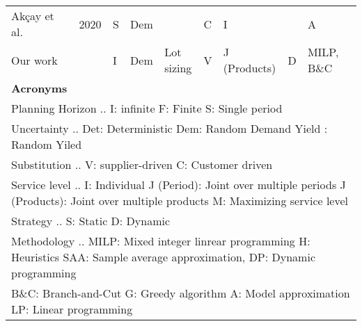 \documentclass[11pt]{article}
\begin{document}
\begin{table}[]
\begin{adjustbox}{width=1\textwidth,center=\textwidth}
\begin{tabular}{llllllllll}
Akçay et al.~\cite{akccaycategory}               & 2020                                    & S                                       & Dem                               &                                 & C                   & I                            &                & \multicolumn{2}{l}{A }\\
Our work                  &                                         & I                                       & Dem                               & Lot sizing                      & V                   & J (Products)                 & D              & MILP, B\&C                &              

\\
\midrule
\textbf{Acronyms}                  &                                         &                                         &                                   &                                 &                     &                              &                &                           &              \\
\multicolumn{10}{l}{Planning Horizon ..          I: infinite                              F: Finite                               S: Single period}                                           \\
\multicolumn{10}{l}{
Uncertainty ..               Det: Deterministic                       Dem: Random Demand                      Yield : Random Yiled}\\

\multicolumn{10}{l}{
Substitution ..              V: supplier-driven                          C: Customer driven }                                     \\
\multicolumn{10}{l}{
Service level  ..            I: Individual                            J (Period): Joint over multiple periods  J (Products): Joint over multiple   products  M: Maximizing service level  }         \\
\multicolumn{10}{l}{
Strategy    ..               S: Static                                D: Dynamic  }               \\
\multicolumn{10}{l}{
Methodology   ..             MILP: Mixed integer linrear programming  H: Heuristics                            SAA: Sample average approximation, DP: Dynamic programming }             \\

\multicolumn{10}{l}{
  B\&C: Branch-and-Cut             G: Greedy algorithm  A: Model approximation      LP: Linear programming}               \\
  \bottomrule
\end{tabular}
\end{adjustbox}
\label{tab:litRev}
\end{table}
\end{document}
